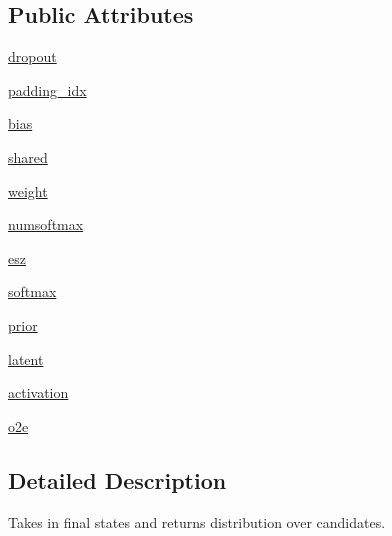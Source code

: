 \subsection*{Public Attributes}
\begin{DoxyCompactItemize}
\item 
\hyperlink{classparlai_1_1agents_1_1seq2seq_1_1modules_1_1OutputLayer_aa9bb2d06eae7ebeb2fc1d2d0a27e0c3b}{dropout}
\item 
\hyperlink{classparlai_1_1agents_1_1seq2seq_1_1modules_1_1OutputLayer_acc82ef26b2a162662c729fc325d39b54}{padding\+\_\+idx}
\item 
\hyperlink{classparlai_1_1agents_1_1seq2seq_1_1modules_1_1OutputLayer_af9588423b3853ca292927fc37a24a674}{bias}
\item 
\hyperlink{classparlai_1_1agents_1_1seq2seq_1_1modules_1_1OutputLayer_a83aa3c50706ed16f09ee44423dbb73ad}{shared}
\item 
\hyperlink{classparlai_1_1agents_1_1seq2seq_1_1modules_1_1OutputLayer_a7a1a9304974964821e1d4d73bdccec0a}{weight}
\item 
\hyperlink{classparlai_1_1agents_1_1seq2seq_1_1modules_1_1OutputLayer_a1a08bf54424b676bb5f35aa2ca8dc096}{numsoftmax}
\item 
\hyperlink{classparlai_1_1agents_1_1seq2seq_1_1modules_1_1OutputLayer_a8764480c3d69166a1bc8b80886c16a97}{esz}
\item 
\hyperlink{classparlai_1_1agents_1_1seq2seq_1_1modules_1_1OutputLayer_ab2922db72cff29a3c4853dd25a464a93}{softmax}
\item 
\hyperlink{classparlai_1_1agents_1_1seq2seq_1_1modules_1_1OutputLayer_aa727b98d848c1dcdee4149255d2d30ed}{prior}
\item 
\hyperlink{classparlai_1_1agents_1_1seq2seq_1_1modules_1_1OutputLayer_ace91a61ce9d1afaf8e69c8891dc37de4}{latent}
\item 
\hyperlink{classparlai_1_1agents_1_1seq2seq_1_1modules_1_1OutputLayer_a0654abd36d1e9fc9425ac366ded9d624}{activation}
\item 
\hyperlink{classparlai_1_1agents_1_1seq2seq_1_1modules_1_1OutputLayer_a0d76edf5fb553c45e025103b154b34a1}{o2e}
\end{DoxyCompactItemize}


\subsection{Detailed Description}
\begin{DoxyVerb}Takes in final states and returns distribution over candidates.\end{DoxyVerb}
 

